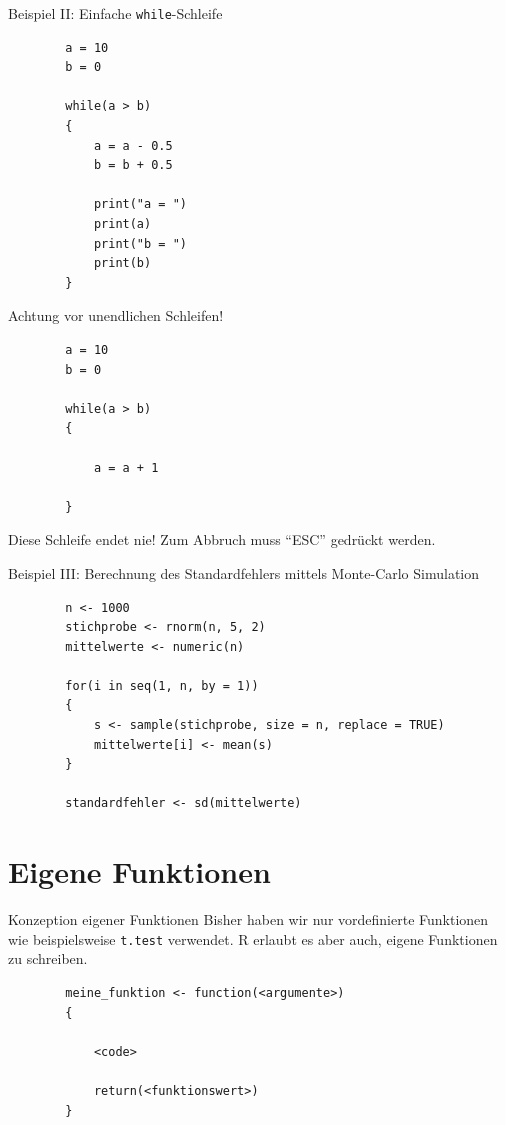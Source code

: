 \documentclass[xcolor=dvipsnames, aspectratio = 169]{beamer}
\begin{document}
\begin{frame}[fragile]{Beispiel II: Einfache \texttt{while}-Schleife}
    \begin{verbatim}
        a = 10
        b = 0
        
        while(a > b) 
        {
            a = a - 0.5
            b = b + 0.5
            
            print("a = ")
            print(a)
            print("b = ")
            print(b)
        }
    \end{verbatim}
\end{frame}

\begin{frame}[fragile]{Achtung vor unendlichen Schleifen!}
    \begin{verbatim}
        a = 10
        b = 0
        
        while(a > b) 
        {
            
            a = a + 1
            
        }
    \end{verbatim}
    Diese Schleife endet nie! Zum Abbruch muss ``ESC'' gedrückt werden.
\end{frame}

\begin{frame}[fragile]{Beispiel III: Berechnung des Standardfehlers mittels Monte-Carlo Simulation}
    \begin{verbatim}
        n <- 1000
        stichprobe <- rnorm(n, 5, 2)
        mittelwerte <- numeric(n)
        
        for(i in seq(1, n, by = 1)) 
        {
            s <- sample(stichprobe, size = n, replace = TRUE)
            mittelwerte[i] <- mean(s)
        }
        
        standardfehler <- sd(mittelwerte)
    \end{verbatim}
\end{frame}

\section{Eigene Funktionen}

\begin{frame}[fragile]{Konzeption eigener Funktionen}
    Bisher haben wir nur vordefinierte Funktionen wie beispielsweise \texttt{t.test} verwendet. \textsf R erlaubt es aber auch, eigene Funktionen zu schreiben.\bigskip
    \begin{verbatim}
        meine_funktion <- function(<argumente>) 
        {
            
            <code>
            
            return(<funktionswert>)
        } 
    \end{verbatim}
\end{frame}
\end{document}
